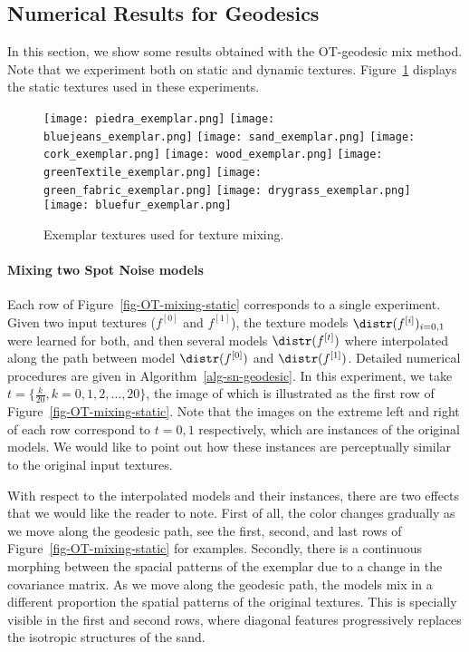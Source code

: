 \subsection{Numerical Results for Geodesics}

In this section, we show some results obtained with the OT-geodesic mix method.
Note that we experiment both on static and dynamic textures.
Figure~\ref{fig-exemplar-textures} displays the static textures used in these experiments.
\begin{figure}[ht!]
  \centering
  \texttt{[image: piedra\_exemplar.png]}
  \texttt{[image: bluejeans\_exemplar.png]}
  \texttt{[image: sand\_exemplar.png]}
  \texttt{[image: cork\_exemplar.png]}
  \texttt{[image: wood\_exemplar.png]}
  \texttt{[image: greenTextile\_exemplar.png]}
  \texttt{[image: green\_fabric\_exemplar.png]}
  \texttt{[image: drygrass\_exemplar.png]}
  \texttt{[image: bluefur\_exemplar.png]}\\
  \caption{Exemplar textures used for texture mixing.  }
  \label{fig-exemplar-textures}
\end{figure}

\paragraph{Mixing two Spot Noise models}
Each row of Figure~\ref{fig-OT-mixing-static} corresponds to a single experiment. Given two input textures ($f^{[0]}$ and $f^{[1]}$), the texture models $\distr(f^{[i]})_{i=0,1}$ were learned for both, and then several models $\distr(f^{[t]})$ where interpolated along the path between model $\distr(f^{[0]})$ and $\distr(f^{[1]})$.
Detailed numerical procedures are given in Algorithm~\ref{alg-sn-geodesic}. %
In this experiment, we take $t=\{ \frac{k}{20}, k=0, 1,2,\ldots,20 \}$, the image of which is illustrated as the first row of Figure~\ref{fig-OT-mixing-static}.  Note that the images on the extreme left and right of each row correspond to $t=0,1$ respectively, which are instances of the original models. We would like to point out how these instances are perceptually similar to the original input textures.

With respect to the interpolated models and their instances, there are two effects that we would like the reader to note. First of all, the color changes gradually as we move along the geodesic path, see the first, second, and last rows of Figure~\ref{fig-OT-mixing-static} for examples. Secondly, there is a continuous morphing between the spacial patterns of the exemplar due to a change in the covariance matrix. As we move along the geodesic path, the models mix in a different proportion the spatial patterns of the original textures.  This is specially visible in the first and second rows, where diagonal features progressively replaces the isotropic structures of the sand.

